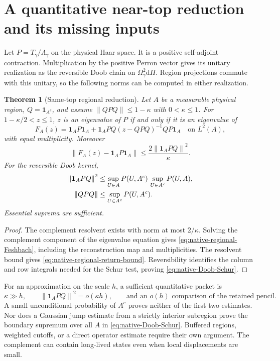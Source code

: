 \documentclass[11pt,oneside,openany]{book}
\newtheorem{theorem}{Theorem}[chapter]
\theoremstyle{definition}
\theoremstyle{remark}
\newcommand{\one}{\mathbf1}
\newcommand{\dd}{\mathrm d}
\newcommand{\norm}[1]{\left\lVert#1\right\rVert}
\begin{document}
\section{A quantitative near-top reduction and its missing inputs}
\label{sec:native-Feshbach-reduction}
Let $P=T_\gamma/\Lambda_\gamma$ on the physical Haar space. It is a
positive self-adjoint contraction. Multiplication by the positive
Perron vector gives its unitary realization as the reversible Doob
chain on $\Omega_\gamma^2\dd H$. Region projections commute with this
unitary, so the following norms can be computed in either realization.

\begin{theorem}[Same-top regional reduction]
\label{thm:native-regional-Feshbach}
Let $A$ be a measurable physical region, $Q=\one_{A^c}$, and assume
$\norm{QPQ}\le1-\kappa$ with $0<\kappa\le1$. For
$1-\kappa/2<z\le1$, $z$ is an eigenvalue of $P$ if and only if it
is an eigenvalue of
\begin{equation}
 F_A(z)=\one_AP\one_A+
         \one_APQ(z-QPQ)^{-1}QP\one_A
                    \quad\text{on }L^2(A),
 \label{eq:native-regional-Feshbach}
\end{equation}
with equal multiplicity. Moreover
\begin{equation}
 \norm{F_A(z)-\one_AP\one_A}
                         \le\frac{2\norm{\one_APQ}^2}{\kappa}.
 \label{eq:native-regional-return-bound}
\end{equation}
For the reversible Doob kernel,
\begin{align}
 \norm{\one_APQ}^2
 &\le\sup_{U\in A}P(U,A^c)\,
                   \sup_{U\in A^c}P(U,A),\notag\\
 \norm{QPQ}&\le\sup_{U\in A^c}P(U,A^c).
 \label{eq:native-Doob-Schur}
\end{align}
Essential suprema are sufficient.
\end{theorem}
\begin{proof}
The complement resolvent exists with norm at most $2/\kappa$.
Solving the complement component of the eigenvalue equation gives
\cref{eq:native-regional-Feshbach}, including the reconstruction map
and multiplicities. The resolvent bound gives
\cref{eq:native-regional-return-bound}. Reversibility identifies the
column and row integrals needed for the Schur test, proving
\cref{eq:native-Doob-Schur}.
\end{proof}

For an approximation on the scale $h$, a sufficient quantitative
packet is
\begin{equation}
 \kappa\gg h,\qquad \norm{\one_APQ}^2=o(\kappa h),
 \qquad\text{and an }o(h)\text{ comparison of the retained pencil}.
 \label{eq:native-uniform-packet}
\end{equation}
A small unconditional probability of $A^c$ proves neither of the
first two estimates. Nor does a Gaussian jump estimate from a strictly
interior subregion prove the boundary supremum over all $A$ in
\cref{eq:native-Doob-Schur}. Buffered regions, weighted cutoffs, or a
direct operator estimate require their own argument. The complement
can contain long-lived states even when local displacements are small.
\end{document}
